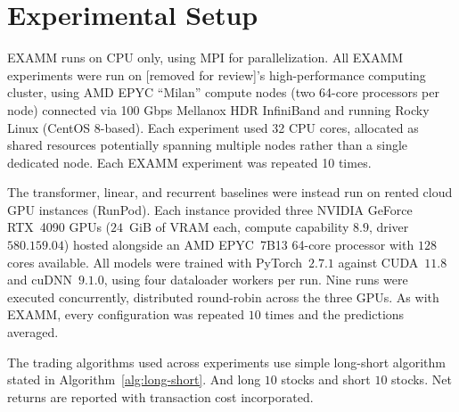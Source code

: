 \section{Experimental Setup}
\label{sec:experimental-setup}
EXAMM runs on CPU only, using MPI for parallelization. All EXAMM experiments were run on [removed for review]'s high-performance computing cluster, using AMD EPYC ``Milan'' compute nodes (two 64-core processors per node) connected via 100 Gbps Mellanox HDR InfiniBand and running Rocky Linux (CentOS 8-based). Each experiment used 32 CPU cores, allocated as shared resources potentially spanning multiple nodes rather than a single dedicated node. Each EXAMM experiment was repeated 10 times. 

%
%
The transformer, linear, and recurrent baselines were instead run on rented cloud
GPU instances (RunPod). Each instance provided three NVIDIA GeForce RTX~4090 GPUs
($24$~GiB of VRAM each, compute capability $8.9$, driver $580.159.04$) hosted
alongside an AMD EPYC~7B13 64-core processor with $128$ cores available. All
models were trained with PyTorch~$2.7.1$ against CUDA~$11.8$ and cuDNN~$9.1.0$,
using four dataloader workers per run. Nine runs were executed concurrently,
distributed round-robin across the three GPUs. As with EXAMM, every
configuration was repeated $10$ times and the predictions averaged.

The trading algorithms used across experiments use simple long-short algorithm stated in Algorithm~\ref{alg:long-short}. And long $10$ stocks and short $10$ stocks. Net returns are reported with transaction cost incorporated. 

